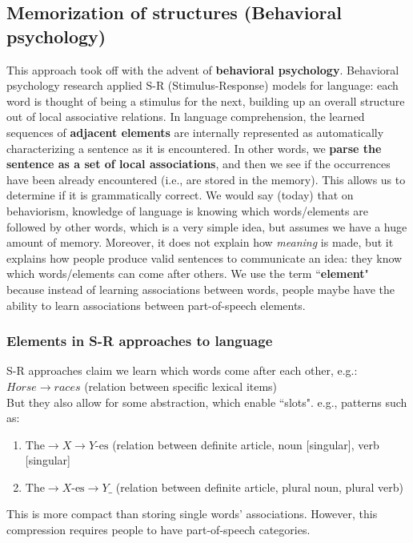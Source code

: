\subsection{Memorization of structures (Behavioral psychology)}
This approach took off with the advent of \textbf{behavioral psychology}.
Behavioral psychology research applied S-R (Stimulus-Response) models for language: each word is thought of being a stimulus for the next, building up an overall structure out of local associative relations.
In language comprehension, the learned sequences of \textbf{adjacent elements} are internally represented as automatically characterizing a sentence as it is encountered. In other words, we \textbf{parse the sentence as a set of local associations}, and then we see if the occurrences have been already encountered (i.e., are stored in the memory). This allows us to determine if it is grammatically correct. We would say (today) that on behaviorism, knowledge of language is 
knowing which words/elements are followed by other words, which is a very simple idea, but assumes we have a huge amount of memory.
Moreover, it does not explain how \textit{meaning} is made, but it explains how people produce valid sentences to communicate an idea: they know which words/elements can come after others.
We use the term ``\textbf{element}" because instead of learning associations between words, people maybe have the ability to learn associations between part-of-speech elements.

\subsubsection{Elements in S-R approaches to language}
S-R approaches claim we learn which words come after each other, e.g.:\\
$Horse \rightarrow races$ (relation between specific lexical items)\\
But they also allow for some abstraction, which enable ``slots". e.g., patterns such as:
\begin{enumerate}
    \item $\text{The} \rightarrow X \rightarrow Y\text{-es}$ (relation between definite article, noun [singular], verb [singular]
    \item $\text{The} \rightarrow X\text{-es}\rightarrow Y\_$ (relation between definite article, plural noun, plural verb)
\end{enumerate}
This is more compact than storing single words' associations. However, this compression requires people to have part-of-speech categories.

